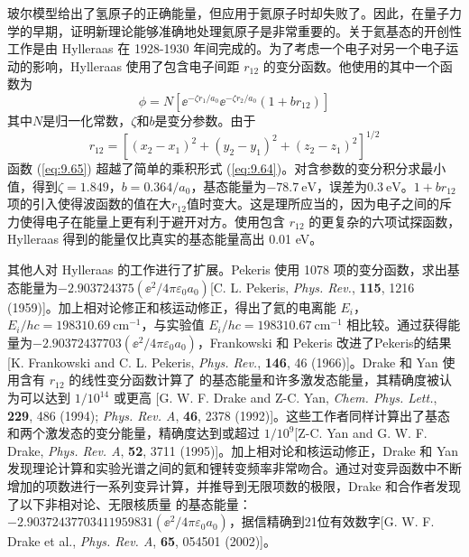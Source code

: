     玻尔模型给出了氢原子的正确能量，但应用于氦原子时却失败了。因此，在量子力学的早期，证明新理论能够准确地处理氦原子是非常重要的。关于氦基态的开创性工作是由 Hylleraas 在 1928-1930 年间完成的。为了考虑一个电子对另一个电子运动的影响，Hylleraas 使用了包含电子间距 $r_{12}$ 的变分函数。他使用的其中一个函数为
    \begin{equation}
        \phi = N\left[\ee ^{-\zeta r_1/a_0} \ee ^{-\zeta r_2/a_0}\left(1 + br_{12}\right)\right]
        \label{eq:9.65}
    \end{equation}
    其中$N$是归一化常数，$\zeta$和$b$是变分参数。由于
    \begin{equation}
        r_{12} = \left[\left(x_2 - x_1\right)^2 + \left(y_2 - y_1\right)^2 + \left(z_2 - z_1\right)^2\right]^{1/2}
        \label{eq:9.66}
    \end{equation}
    函数 (\ref{eq:9.65}) 超越了简单的乘积形式 (\ref{eq:9.64})。对含参数的变分积分求最小值，得到$\zeta = 1.849$，$b = 0.364/a_0$，基态能量为$-78.7 \:\mathrm{eV}$，误差为$0.3 \: \mathrm{eV}$。$1+br_{12}$项的引入使得波函数的值在大$r_{12}$值时变大。这是理所应当的，因为电子之间的斥力使得电子在能量上更有利于避开对方。使用包含 $r_{12}$ 的更复杂的六项试探函数，Hylleraas 得到的能量仅比真实的基态能量高出 0.01 eV。

    其他人对 Hylleraas 的工作进行了扩展。Pekeris 使用 1078 项的变分函数，求出基态能量为$-2.903724375\left(\ee ^2 / 4\pi\varepsilon_0a_0\right)$[C. L. Pekeris, \textit{Phys. Rev.}, \textbf{115}, 1216 (1959)]。加上相对论修正和核运动修正，得出了氦的电离能 $E_i$，$E_i/hc = 198310.69 \: \mathrm{cm}^{-1}$，与实验值 $E_i/hc = 198310.67 \: \mathrm{cm}^{-1}$ 相比较。通过获得能量为$-2.90372437703 \left(\ee ^2 / 4\pi\varepsilon_0a_0\right)$，Frankowski 和 Pekeris 改进了Pekeris的结果[K. Frankowski and C. L. Pekeris, \textit{Phys. Rev.}, \textbf{146}, 46 (1966)]。Drake 和 Yan 使用含有 $r_{12}$ 的线性变分函数计算了  的基态能量和许多激发态能量，其精确度被认为可以达到 $1/10^{14}$ 或更高 [G. W. F. Drake and Z-C. Yan, \textit{Chem. Phys. Lett.}, \textbf{229}, 486 (1994); \textit{Phys. Rev. A}, \textbf{46}, 2378 (1992)]。这些工作者同样计算出了基态和两个激发态的变分能量，精确度达到或超过 $1/10^9$[Z-C. Yan and G. W. F. Drake, \textit{Phys. Rev. A}, \textbf{52}, 3711 (1995)]。加上相对论和核运动修正，Drake 和 Yan 发现理论计算和实验光谱之间的氦和锂转变频率非常吻合。通过对变异函数中不断增加的项数进行一系列变异计算，并推导到无限项数的极限，Drake 和合作者发现了以下非相对论、无限核质量  的基态能量：$-2.90372437703411959831 \left(\ee ^2 / 4\pi\varepsilon_0a_0\right)$，据信精确到21位有效数字[G. W. F. Drake et al., \textit{Phys. Rev. A}, \textbf{65}, 054501 (2002)]。

